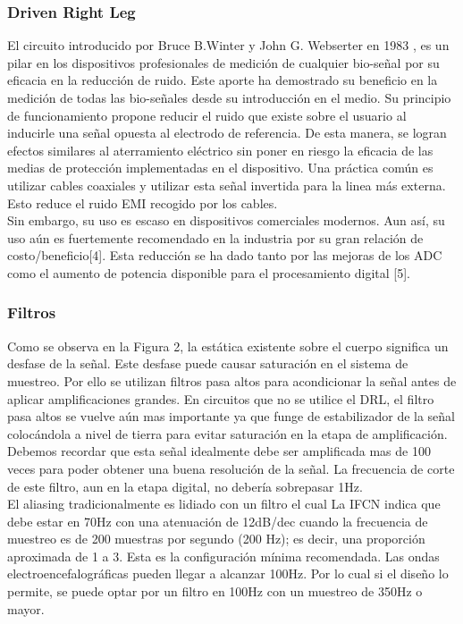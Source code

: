 \subsubsection{Driven Right Leg}
\label{sec:orgc424e14}
El circuito introducido por Bruce B.Winter y John G. Webserter en 1983 \cite{Winter1983}, es un pilar en los dispositivos profesionales de medición de cualquier bio-señal por su eficacia en la reducción de ruido. Este aporte ha demostrado su beneficio en la medición de todas las bio-señales desde su introducción en el medio. Su principio de funcionamiento propone reducir el ruido que existe sobre el usuario al inducirle una señal opuesta al electrodo de referencia. De esta manera, se logran efectos similares al aterramiento eléctrico sin poner en riesgo la eficacia de las medias de protección implementadas en el dispositivo. Una práctica común es utilizar cables coaxiales y utilizar esta señal invertida para la linea más externa. Esto reduce el ruido EMI recogido por los cables.\\

Sin embargo, su uso es escaso en dispositivos comerciales modernos. Aun así, su uso aún es fuertemente recomendado en la industria por su gran relación de costo/beneficio[4]. Esta reducción se ha dado tanto por las mejoras de los ADC como el aumento de potencia disponible para el procesamiento digital [5].\\

\subsubsection{Filtros}
\label{sec:org7dc5fd8}
Como se observa en la Figura 2, la estática existente sobre el cuerpo significa un desfase de la señal. Este desfase puede causar saturación en el sistema de muestreo. Por ello se utilizan filtros pasa altos para acondicionar la señal antes de aplicar amplificaciones grandes. En circuitos que no se utilice el DRL, el filtro pasa altos se vuelve aún mas importante ya que funge de estabilizador de la señal colocándola a nivel de tierra para evitar saturación en la etapa de amplificación. Debemos recordar que esta señal idealmente debe ser amplificada mas de 100 veces para poder obtener una buena resolución de la señal. La frecuencia de corte de este filtro, aun en la etapa digital, no debería sobrepasar 1Hz.\\

El aliasing tradicionalmente es lidiado con un filtro el cual La IFCN indica que debe estar en 70Hz con una atenuación de 12dB/dec cuando la frecuencia de muestreo es de 200 muestras por segundo (200 Hz); es decir, una proporción aproximada de 1 a 3. Esta es la configuración mínima recomendada. Las ondas electroencefalográficas pueden llegar a alcanzar 100Hz. Por lo cual si el diseño lo permite, se puede optar por un filtro en 100Hz con un muestreo de 350Hz o mayor.\\

